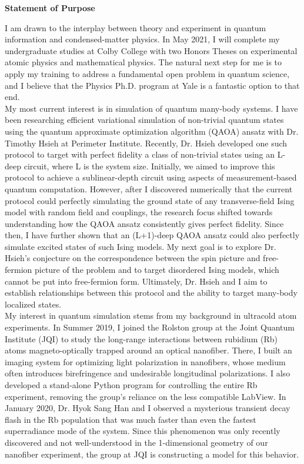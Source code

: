 \documentclass[12pt]{article}
\begin{document}
\begin{center}
	\textbf{Statement of Purpose}
\end{center}
I am drawn to the interplay between theory and experiment in quantum information and condensed-matter physics. In May 2021, I will complete my undergraduate studies at Colby College with two Honors Theses on experimental atomic physics and mathematical physics. The natural next step for me is to apply my training to address a fundamental open problem in quantum science, and I believe that the Physics Ph.D. program at Yale is a fantastic option to that end.  \\ 

My most current interest is in simulation of quantum many-body systems. I have been researching efficient variational simulation of non-trivial quantum states using the quantum approximate optimization algorithm (QAOA) ansatz with Dr. Timothy Hsieh at Perimeter Institute. Recently, Dr. Hsieh developed one such protocol to target with perfect fidelity a class of non-trivial states using an L-deep circuit, where L is the system size. Initially, we aimed to improve this protocol to achieve a sublinear-depth circuit using aspects of measurement-based quantum computation. However, after I discovered numerically that the current protocol could perfectly simulating the ground state of any transverse-field Ising model with random field and couplings, the research focus shifted towards understanding how the QAOA ansatz consistently gives perfect fidelity. Since then, I have further shown that an (L+1)-deep QAOA ansatz could also perfectly simulate excited states of such Ising models. My next goal is to explore Dr. Hsieh's conjecture on the correspondence between the spin picture and free-fermion picture of the problem and to target disordered Ising models, which cannot be put into free-fermion form. Ultimately, Dr. Hsieh and I aim to establish relationships between this protocol and the ability to target many-body localized states.\\

My interest in quantum simulation stems from my background in ultracold atom experiments. In Summer 2019, I joined the Rolston group at the Joint Quantum Institute (JQI) to study the long-range interactions between rubidium (Rb) atoms magneto-optically trapped around an optical nanofiber. There, I built an imaging system for optimizing light polarization in nanofibers, whose medium often introduces birefringence and undesirable longitudinal polarizations. I also developed a stand-alone Python program for controlling the entire Rb experiment, removing the group's reliance on the less compatible LabView. In January 2020, Dr. Hyok Sang Han and I observed a mysterious transient decay flash in the Rb population that was much faster than even the fastest superradiance mode of the system. Since this phenomenon was only recently discovered and not well-understood in the 1-dimensional geometry of our nanofiber experiment, the group at JQI is constructing a model for this behavior.   \\ 
\end{document}

